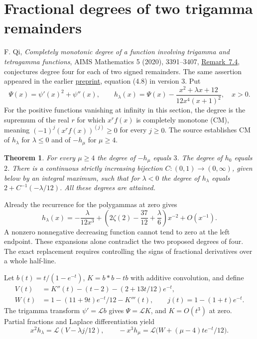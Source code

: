 \documentclass[11pt,a4paper]{article}
\newtheorem{theorem}{Theorem}[section]
\numberwithin{equation}{section}
\begin{document}
\section{Fractional degrees of two trigamma remainders}\label{sec:degrees}
F. Qi, \emph{Completely monotonic degree of a function involving trigamma
and tetragamma functions}, AIMS Mathematics 5 (2020), 3391--3407,
\href{https://doi.org/10.3934/math.2020219}{Remark~7.4},
conjectures degree four for each of two signed remainders. The same
assertion appeared in the earlier \href{https://arxiv.org/abs/1301.0154}{preprint},
equation (4.8) in version 3. Put
\[
 \Psi(x)=\psi'(x)^2+\psi''(x),\qquad
 h_\lambda(x)=\Psi(x)-\frac{x^2+\lambda x+12}{12x^4(x+1)^2},\quad x>0 .
\]
For the positive functions vanishing at infinity in this section, the
degree is the supremum of the real $r$ for which $x^rf(x)$ is completely
monotone (CM), meaning $(-1)^j(x^rf(x))^{(j)}\ge0$ for every $j\ge0$.
The source establishes CM of $h_\lambda$ for $\lambda\le0$ and of
$-h_\mu$ for $\mu\ge4$.

\begin{theorem}\label{th:trigamma-degrees}
For every $\mu\ge4$ the degree of $-h_\mu$ equals $3$.
The degree of $h_0$ equals $2$. There is a continuous strictly increasing
bijection $C:(0,1)\to(0,\infty)$, given below by an integral maximum,
such that for $\lambda<0$ the degree of $h_\lambda$ equals
$2+C^{-1}(-\lambda/12)$. All these degrees are attained.
\end{theorem}

Already the recurrence for the polygammas at zero gives
\[
 h_\lambda(x)=-\frac{\lambda}{12x^3}
 +\left(2\zeta(2)-\frac{37}{12}+\frac{\lambda}{6}\right)x^{-2}
 +O(x^{-1}).
\]
A nonzero nonnegative decreasing function cannot tend to zero at the
left endpoint. These expansions alone contradict the two proposed
degrees of four. The exact replacement requires controlling the signs
of fractional derivatives over a whole half-line.

Let $b(t)=t/(1-e^{-t})$, $K=b*b-tb$ with additive convolution, and define
\begin{align*}
 V(t)&=K''(t)-(t-2)-(2+13t/12)e^{-t},\\
 W(t)&=1-(11+9t)e^{-t}/12-K'''(t),\qquad
 j(t)=1-(1+t)e^{-t}.
\end{align*}
The trigamma transform $\psi'=\mathcal L b$ gives $\Psi=\mathcal L K$,
and $K=O(t^3)$ at zero. Partial fractions and Laplace differentiation yield
\[
 x^2h_\lambda=\mathcal L(V-\lambda j/12),\qquad
 -x^3h_\mu=\mathcal L\bigl(W+(\mu-4)te^{-t}/12\bigr).
\]
\end{document}
